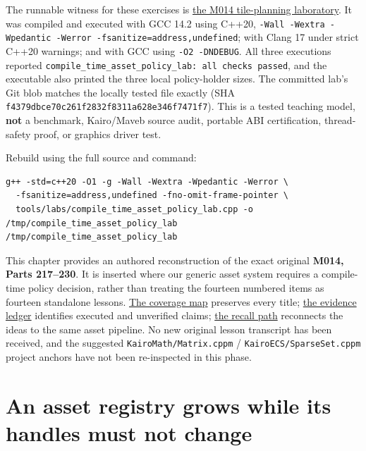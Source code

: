 The runnable witness for these exercises is \hyperref[source-file-f5eb017280bb6b2ae6b1475d]{the M014 tile-planning laboratory}. It was compiled and executed with GCC 14.2 using C++20, \texttt{-Wall\ -Wextra\ -Wpedantic\ -Werror\ -fsanitize=address,undefined}; with Clang 17 under strict C++20 warnings; and with GCC using \texttt{-O2\ -DNDEBUG}. All three executions reported \texttt{compile\_time\_asset\_policy\_lab:\ all\ checks\ passed}, and the executable also printed the three local policy-holder sizes. The committed lab's Git blob matches the locally tested file exactly (SHA \texttt{f4379dbce70c261f2832f8311a628e346f7471f7}). This is a tested teaching model, \textbf{not} a benchmark, Kairo/Maveb source audit, portable ABI certification, thread-safety proof, or graphics driver test.

Rebuild using the full source and command:

\begin{verbatim}
g++ -std=c++20 -O1 -g -Wall -Wextra -Wpedantic -Werror \
  -fsanitize=address,undefined -fno-omit-frame-pointer \
  tools/labs/compile_time_asset_policy_lab.cpp -o /tmp/compile_time_asset_policy_lab
/tmp/compile_time_asset_policy_lab
\end{verbatim}

This chapter provides an authored reconstruction of the exact original \textbf{M014, Parts 217--230}. It is inserted where our generic asset system requires a compile-time policy decision, rather than treating the fourteen numbered items as fourteen standalone lessons. \hyperref[appendix-fd090d982a15-m014-parts-217230-one-tile-planner-and-its-compile-time-policy-decisions]{The coverage map} preserves every title; \hyperref[appendix-a103e7846d21-phase-4-additive-reconstruction-m014-parts-217230]{the evidence ledger} identifies executed and unverified claims; \hyperref[appendix-960160274237-the-tile-planner-makes-a-choice-m014-reconstruction]{the recall path} reconnects the ideas to the same asset pipeline. No new original lesson transcript has been received, and the suggested \texttt{KairoMath/Matrix.cppm} / \texttt{KairoECS/SparseSet.cppm} project anchors have not been re-inspected in this phase.

\section{An asset registry grows while its handles must not change}\label{05-engine-i-ch005-an-asset-registry-grows-while-its-handles-must-not-change}


